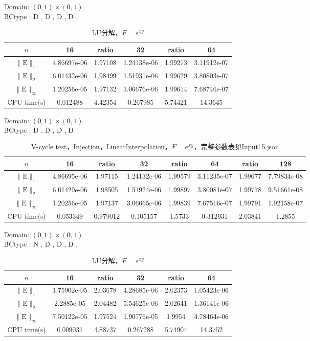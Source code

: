 \documentclass[a4paper,twoside]{ctexart}
\begin{document}
\noindent Domain: $(0,1)\times(0,1)$\\
BCtype : D , D , D , D , 
\begin{table}[htbp]
\centering\begin{tabular}{c|ccccc}
\hline
$n$&16&ratio&32&ratio&64\\
\hline
$\|\mathrm{E}\|_1$&4.86697e-06&1.97108&1.24138e-06&1.99273&3.11912e-07\\
\hline
$\|\mathrm{E}\|_2$&6.01432e-06&1.98499&1.51931e-06&1.99629&3.80803e-07\\
\hline
$\|\mathrm{E}\|_{\infty}$&1.20256e-05&1.97132&3.06676e-06&1.99614&7.68746e-07\\
\hline
CPU time(s)&0.012488&4.42354&0.267985&5.74421&14.3645\\
\hline
\end{tabular}
\caption{LU分解，$F=e^{xy}$}
\end{table}

\noindent Domain: $(0,1)\times(0,1)$\\
BCtype : D , D , D , D
\begin{table}[htbp]
\centering\begin{tabular}{c|ccccccc}
\hline
$n$&16&ratio&32&ratio&64&ratio&128\\
\hline
$\|\mathrm{E}\|_1$&4.86695e-06&1.97115&1.24132e-06&1.99579&3.11235e-07&1.99677&7.79834e-08\\
\hline
$\|\mathrm{E}\|_2$&6.01429e-06&1.98505&1.51924e-06&1.99897&3.80081e-07&1.99778&9.51661e-08\\
\hline
$\|\mathrm{E}\|_{\infty}$&1.20256e-05&1.97137&3.06665e-06&1.99839&7.67516e-07&1.99791&1.92158e-07\\
\hline
CPU time(s)&0.053349&0.979012&0.105157&1.5733&0.312931&2.03841&1.2855\\
\hline
\end{tabular}
\caption{V-cycle test，Injection，LinearInterpolation，$F=e^{xy}$，完整参数表见Input15.json}
\end{table}



\noindent Domain: $(0,1)\times(0,1)$\\
BCtype : N , D , D , D , 
\begin{table}[htbp]
\centering\begin{tabular}{c|ccccc}
\hline
$n$&16&ratio&32&ratio&64\\
\hline
$\|\mathrm{E}\|_1$&1.75902e-05&2.03678&4.28685e-06&2.02373&1.05423e-06\\
\hline
$\|\mathrm{E}\|_2$&2.2885e-05&2.04482&5.54625e-06&2.02641&1.36141e-06\\
\hline
$\|\mathrm{E}\|_{\infty}$&7.50122e-05&1.97524&1.90776e-05&1.9954&4.78464e-06\\
\hline
CPU time(s)&0.009031&4.88737&0.267288&5.74904&14.3752\\
\hline
\end{tabular}
\caption{LU分解，$F=e^{xy}$}
\end{table}
\end{document}
